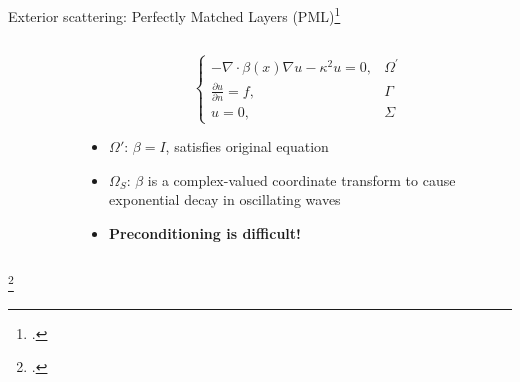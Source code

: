 \documentclass{beamer}
\begin{document}
\begin{frame}{Exterior scattering: Perfectly Matched Layers (PML)\footcite{BERENGER1994185,Erlangga_2006,Bermudez_Hervella-Nieto_Prieto_Rodrguez_2006}}
    \begin{columns}
    \begin{column}{0.45\textwidth}
        \begin{figure}[ht]
        \begin{center}
        \end{center}
        \end{figure}
        \vfill
    \end{column}
    \begin{column}{0.55\textwidth}
        \[
            \begin{cases}
                -\nabla \cdot \beta(x) \nabla u - \kappa^2 u = 0,  & \Omega^\prime \\
                \frac{\partial u}{\partial n}  =  f, &\Gamma \\
                u = 0, &\Sigma
            \end{cases}
        \]
            \begin{itemize}
              \item<2-> $\Omega'$: $\beta = I$, satisfies original equation
              \item<3-> $\Omega_S$: $\beta$ is a complex-valued coordinate transform to cause exponential decay
              in oscillating waves
              \item<4-> {\bf Preconditioning is difficult!\footnotemark}
            \end{itemize}
    \end{column}
    \end{columns}
    \footcitetext{EngquistPMLPreconditioner2011,Safin_Minkoff_Zweck_2018}
\end{frame}
\end{document}
